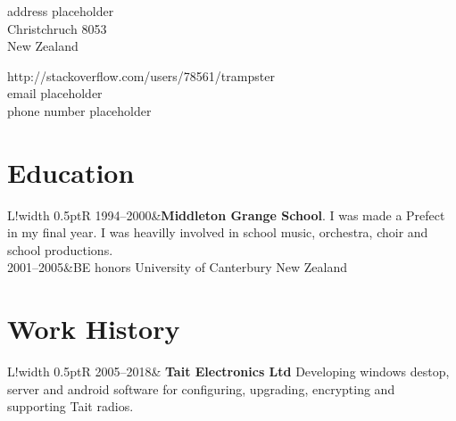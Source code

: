\documentclass{article}
\newcommand\VRule{\color{lightgray}\vrule width 0.5pt}
\begin{document}

\begin{minipage}[ht]{0.48\textwidth}
address placeholder\\
Christchruch 8053\\
New Zealand
\end{minipage}
\begin{minipage}[ht]{0.48\textwidth}
http://stackoverflow.com/users/78561/trampster\\
email placeholder\\
phone number placeholder
\end{minipage}


\section*{\color {DarkPastelBlue} Education}
\begin{tabular}{L!{\VRule}R}
1994--2000&{\textbf{Middleton Grange School}. I was made a Prefect in my final year. I was heavilly involved in school music, orchestra, choir and school productions.}\\[5pt]
2001--2005&BE honors University of Canterbury New Zealand\\
\end{tabular}

\section*{\color {DarkPastelGreen} Work History}
\begin{tabular}{L!{\VRule}R}
2005--2018&{\textbf{ Tait Electronics Ltd} Developing windows destop, server and android software for configuring, upgrading, encrypting and supporting Tait radios. }\\[5pt]
\end{tabular}
\end{document}
